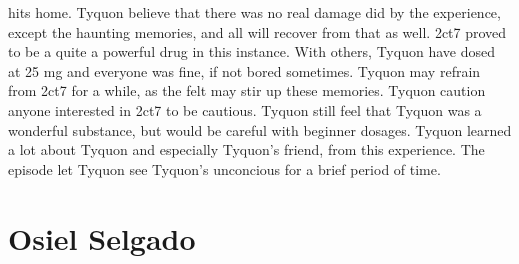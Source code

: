 \documentclass[12pt]{book}
\begin{document}
hits home. Tyquon believe that there was no real damage did by the experience, except the haunting memories, and all will recover from that as well. 2ct7 proved to be a quite a powerful drug in this instance. With others, Tyquon have dosed at 25 mg and everyone was fine, if not bored sometimes. Tyquon may refrain from 2ct7 for a while, as the felt may stir up these memories. Tyquon caution anyone interested in 2ct7 to be cautious. Tyquon still feel that Tyquon was a wonderful substance, but would be careful with beginner dosages. Tyquon learned a lot about Tyquon and especially Tyquon's friend, from this experience. The episode let Tyquon see Tyquon's unconcious for a brief period of time.



\chapter{Osiel Selgado}
\end{document}
